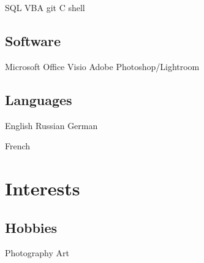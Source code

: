 \documentclass[]{plushcv}
\begin{document}
\begin{minipage}[t]{0.25\textwidth}
	SQL  \tb VBA \tb git \tb C \tb shell 
	\sectionsep
	
	\subsection{Software}
	Microsoft Office \tb Visio \tb Adobe Photoshop/Lightroom
	\sectionsep
	
	\subsection{Languages}
	English \tb Russian \tb German
	\subskip
	
	French
	\sectionsep


\section{Interests}
	\subsection{Hobbies}
	Photography \tb Art

\end{minipage} 
\end{document}
